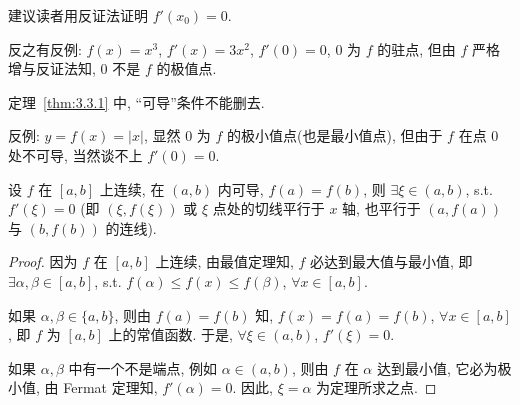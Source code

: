 建议读者用反证法证明 $f'(x_0)=0$.

反之有反例: $f(x)=x^{3}$, $f'(x)=3x^{2}$, $f'(0)=0$, $0$ 为 $f$ 的驻点, 但由 $f$ 严格增与反证法知, $0$ 不是 $f$ 的极值点.

\begin{remark}\label{rem:3.3.1}
定理~\ref{thm:3.3.1} 中, “可导”条件不能删去.

反例: $y=f(x)=|x|$, 显然 $0$ 为 $f$ 的极小值点(也是最小值点), 但由于 $f$ 在点 $0$ 处不可导, 当然谈不上 $f'(0)=0$.
\end{remark}

\begin{figure}[htbp]
\centering
{}
\caption{}\label{fig:3.3.1}
\end{figure}

\begin{theorem}[Rolle (1652---1719) 定理]\label{thm:3.3.2}
设 $f$ 在 $[a,b]$ 上连续, 在 $(a,b)$ 内可导, $f(a)=f(b)$, 则 $\exists\xi\in(a,b)$, s.t. $f'(\xi)=0$ (即 $(\xi,f(\xi))$ 或 $\xi$ 点处的切线平行于 $x$ 轴, 也平行于 $(a,f(a))$ 与 $(b,f(b))$ 的连线).
\end{theorem}

\begin{proof}
因为 $f$ 在 $[a,b]$ 上连续, 由最值定理知, $f$ 必达到最大值与最小值, 即 $\exists\alpha,\beta\in[a,b]$, s.t. $f(\alpha)\leqslant f(x)\leqslant f(\beta)$, $\forall x\in[a,b]$.

如果 $\alpha,\beta\in\{a,b\}$, 则由 $f(a)=f(b)$ 知, $f(x)=f(a)=f(b)$, $\forall x\in[a,b]$, 即 $f$ 为 $[a,b]$ 上的常值函数. 于是, $\forall\xi\in(a,b)$, $f'(\xi)=0$.

如果 $\alpha,\beta$ 中有一个不是端点, 例如 $\alpha\in(a,b)$, 则由 $f$ 在 $\alpha$ 达到最小值, 它必为极小值, 由 Fermat 定理知, $f'(\alpha)=0$. 因此, $\xi=\alpha$ 为定理所求之点.
\end{proof}


